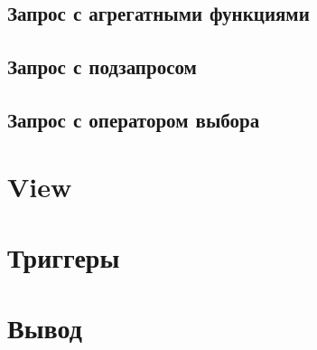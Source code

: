\documentclass[a4paper]{article}
\begin{document}
\subsection{Запрос с агрегатными функциями}

\subsection{Запрос с подзапросом}

\subsection{Запрос с оператором выбора}

\section{View}

\section{Триггеры}

\section{Вывод}
\end{document}

